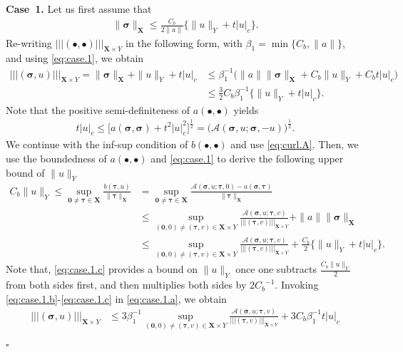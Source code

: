 \documentclass[11pt, reqno, a4paper, twoside]{article}
\newcommand*\tnorm[1]{|\!|\!| #1 |\!|\!|}
\newcommand\bsigma{\boldsymbol{\sigma}}
\newcommand\bzero{\boldsymbol{0}}
\newcommand\btau{\boldsymbol{\tau}}
\newcommand{\bX}{\mathbf{X}}
\newenvironment{proof}{\noindent{\it Proof.}}{\hfill$\square$}
\numberwithin{equation}{section}
\numberwithin{remark}{section}
\numberwithin{figure}{section}
\numberwithin{table}{section}
\begin{document}
\begin{proof}
\smallskip 
\noindent\textbf{Case~1.} Let us first assume that \begin{align}\label{eq:case.1}\|\bsigma\|_{\bX}\leq \frac{C_b}{2\|a\|}\{\|u\|_Y+t|u|_c\}.\end{align}
Re-writing \(\tnorm{(\bullet,\bullet)}_{\bX\times Y} \) in the following form, with \(\beta_1=\min\{{C_b,\|a\|}\},\) and using \eqref{eq:case.1}, we obtain 
\begin{align}\label{eq:case.1.a}\tnorm{(\bsigma,u)}_{\bX\times Y}=\|\bsigma\|_{\bX}+\|u\|_{Y}+t|u|_c\nonumber&\leq \beta_1^{-1}\bigl(\|a\|\|\bsigma\|_{\bX}+C_b\|u\|_Y+C_bt|u|_c\bigr)\nonumber\\
&\leq {\frac32C_b\beta_1^{-1}}\{\|u\|_Y+t|u|_c\}.
\end{align}
Note that the positive semi-definiteness of \(a(\bullet,\bullet)\) yields \begin{align}\label{eq:case.1.b}
t|u|_c\leq\bigl[a(\bsigma,\bsigma)+t^2|u|_c^2\bigr]^{\frac12}=\big(\mathcal{A}(\bsigma,u;\bsigma,-u)\Big)^{\frac12}.\end{align}
We continue with the inf-sup condition of \(b(\bullet,\bullet)\)  and use \eqref{eq:curl.A}. Then, we use the boundedness of \(a(\bullet,\bullet)\) and \eqref{eq:case.1} to derive the following upper bound of \(\|u\|_Y\) 
\begin{align}\label{eq:case.1.c}
C_b\|u\|_Y\leq\sup_{\bzero\neq\btau\in\bX}\frac{b(\btau,u)}{\|\btau\|_{\bX}}&=\sup_{\bzero\neq\btau\in\bX}\frac{\mathcal{A}(\bsigma,u;\btau,0)-a(\bsigma,\btau)}{\|\btau\|_{\bX}}\nonumber\\
&\leq\sup_{(\bzero,0)\neq(\btau,v)\in{\bX\times Y}}\frac{\mathcal{A}(\bsigma,u;\btau,v)}{\tnorm{(\btau,v)}_{\bX\times Y}}+\|a\|\|\bsigma\|_{\bX}\nonumber\\
&\leq\sup_{(\bzero,0)\neq(\btau,v)\in{\bX\times Y}}\frac{\mathcal{A}(\bsigma,u;\btau,v)}{\tnorm{(\btau,v)}_{\bX\times Y}}+\frac{C_b}{2}\{\|u\|_Y+t|u|_c\}.
\end{align}
Note that, \eqref{eq:case.1.c} provides a bound on \({\|u\|_{Y}}\) once one subtracts \(\frac{C_b\|u\|_Y}{2}\) from both sides first, and then multiplies both sides by \({2}{C_b}^{-1}\).
%
Invoking \eqref{eq:case.1.b}-\eqref{eq:case.1.c} in \eqref{eq:case.1.a}, we obtain %
\begin{align}\label{eq:case2.bound}\tnorm{(\bsigma,u)}_{\bX\times Y}&\leq 3\beta_1^{-1}\sup_{(\bzero,0)\neq(\btau,v)\in{\bX\times Y}}\frac{\mathcal{A}(\bsigma,u;\btau,v)}{\tnorm{(\btau,v)}_{\bX\times Y}}+3C_b\beta_1^{-1}t|u|_c\nonumber\\

\end{align}
\end{proof}
\end{document}
